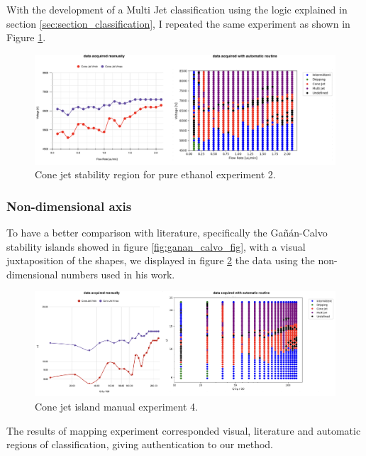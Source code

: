     With the development of a Multi Jet classification using the logic explained in section \ref{sec:section_classification}, I repeated the same experiment as shown in Figure \ref{fig:stability_6}.


        \begin{figure}[H]
            \center
            \includegraphics[width=18cm]{Figuras/april/map_third.png}
            \caption{Cone jet stability region for pure ethanol experiment 2.}
            \label{fig:stability_6}
        \end{figure}


    \subsubsection{Non-dimensional axis}

    To have a better comparison with literature, specifically the Gañán-Calvo\cite{gananCalvo} stability islands showed in figure \ref{fig:ganan_calvo_fig}, with a visual juxtaposition of the shapes, we displayed in figure \ref{fig:stability_8} the data using the non-dimensional numbers used in his work\cite{gananCalvo}.

        \begin{figure}[H]
            \center
            \includegraphics[width=18cm]{Figuras/april/manual_au_1.png}
            \caption{Cone jet island manual experiment 4.}
            \label{fig:stability_8}
        \end{figure}

    The results of mapping experiment corresponded visual, literature and automatic regions of classification, giving authentication to our method.


